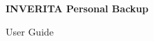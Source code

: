%
%
%
%


\begin{titlepage} 

\begin{center}
\end{center}

\vspace{5cm}

\begin{center}
  \textbf{\Huge{INVERITA Personal Backup}}
\end{center}

\begin{center}
  \huge{User Guide}
\end{center}

\vspace{1cm}

\begin{center}
  \version
\end{center}

\end{titlepage}

